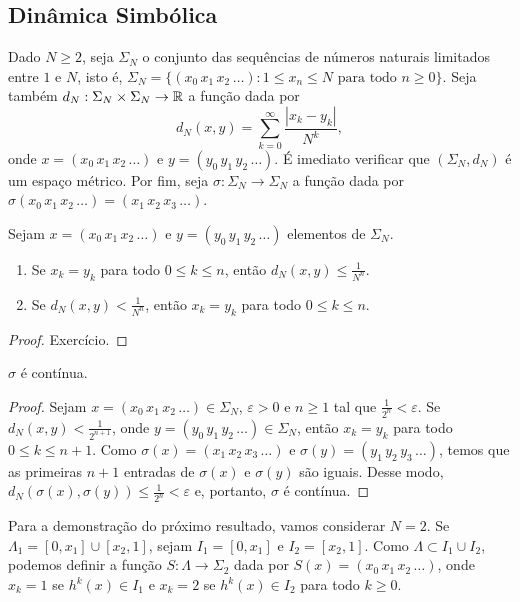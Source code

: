 \subsection{Dinâmica Simbólica}

Dado $N \geq 2$, seja $\Sigma_N$ o conjunto das sequências de números naturais limitados entre $1$ e $N$, isto é, $\Sigma_N = \lbrace (x_0 \, x_1 \, x_2 \, \dots) : 1 \leq x_n \leq N  \text{ para todo } n \geq 0 \rbrace$.
Seja também $d_N : \Sigma_N \times \Sigma_N \to \mathbb{R}$ a função dada por
$$d_N(x, y) = \sum_{k=0}^\infty \frac{|x_k - y_k|}{N^k},$$
onde $x = (x_0 \, x_1 \, x_2 \, \dots)$ e $y = (y_0 \, y_1 \, y_2 \, \dots)$.
É imediato verificar que $(\Sigma_N, d_N)$ é um espaço métrico.
Por fim, seja $\sigma: \Sigma_N \to \Sigma_N$ a função dada por $\sigma(x_0 \, x_1 \, x_2 \, \dots) = (x_1 \, x_2 \, x_3 \, \dots)$.

\begin{proposition}
Sejam $x = (x_0 \, x_1 \, x_2 \, \dots)$ e $y = (y_0 \, y_1 \, y_2 \, \dots)$ elementos de $\Sigma_N$.
\begin{enumerate}
\item Se $x_k = y_k$ para todo $0 \leq k \leq n$, então $d_N(x, y) \leq \frac{1}{N^n}$.
\item Se $d_N(x, y) < \frac{1}{N^n}$, então $x_k = y_k$ para todo $0 \leq k \leq n$.
\end{enumerate}
\end{proposition}

\begin{proof}
Exercício.
\end{proof}

\begin{proposition}
$\sigma$ é contínua.
\end{proposition}

\begin{proof}
Sejam $x = (x_0 \, x_1 \, x_2 \, \dots) \in \Sigma_N$, $\varepsilon > 0$ e $n \geq 1$ tal que $\frac{1}{2^n} < \varepsilon$.
Se $d_N(x, y) < \frac{1}{2^{n+1}}$, onde $y = (y_0 \, y_1 \, y_2 \, \dots) \in \Sigma_N$, então $x_k = y_k$ para todo $0 \leq k \leq n+1$.
Como $\sigma(x) = (x_1 \, x_2 \, x_3  \, \dots)$ e $\sigma(y) = (y_1 \, y_2 \, y_3 \, \dots)$, temos que as primeiras $n+1$ entradas de $\sigma(x)$ e $\sigma(y)$ são iguais. Desse modo,  $d_N(\sigma(x), \sigma(y)) \leq \frac{1}{2^n} < \varepsilon$ e, portanto, $\sigma$ é contínua.
\end{proof}

Para a demonstração do próximo resultado, vamos considerar $N = 2$.
Se $\Lambda_1 = [0, x_1] \cup [x_2, 1]$, sejam $I_1 = [0, x_1]$ e $I_2 = [x_2, 1]$.
Como $\Lambda \subset I_1 \cup I_2$, podemos definir a função $S: \Lambda \to \Sigma_2$ dada por $S(x) = (x_0 \, x_1 \, x_2 \, \dots)$, onde $x_k = 1$ se $h^k(x) \in I_1$ e $x_k = 2$ se $h^k(x) \in I_2$ para todo $k \geq 0$.

